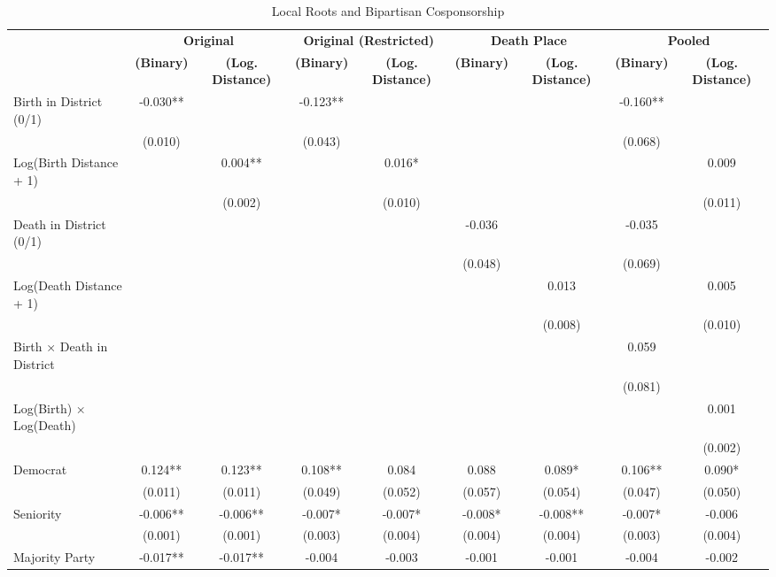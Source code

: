 \begin{table}[t]
\caption{Local Roots and Bipartisan Cosponsorship} 
\fontsize{9.0pt}{11.0pt}\selectfont
\begin{tabular*}{\linewidth}{@{\extracolsep{\fill}}lcccccccc}
\toprule
 & \multicolumn{2}{c}{{\bfseries \textbf{Original}}} & \multicolumn{2}{c}{{\bfseries \textbf{Original (Restricted)}}} & \multicolumn{2}{c}{{\bfseries \textbf{Death Place}}} & \multicolumn{2}{c}{{\bfseries \textbf{Pooled}}} \\ 
\cmidrule(lr){2-3} \cmidrule(lr){4-5} \cmidrule(lr){6-7} \cmidrule(lr){8-9}
{\bfseries  } & {\bfseries (Binary)} & {\bfseries (Log. Distance)} & {\bfseries (Binary)} & {\bfseries (Log. Distance)} & {\bfseries (Binary)} & {\bfseries (Log. Distance)} & {\bfseries (Binary)} & {\bfseries (Log. Distance)} \\ 
\midrule\addlinespace[2.5pt]
Birth in District (0/1) & -0.030** &  & -0.123** &  &  &  & -0.160** &  \\ 
 & (0.010) &  & (0.043) &  &  &  & (0.068) &  \\ 
Log(Birth Distance + 1) &  & 0.004** &  & 0.016* &  &  &  & 0.009 \\ 
 &  & (0.002) &  & (0.010) &  &  &  & (0.011) \\ 
Death in District (0/1) &  &  &  &  & -0.036 &  & -0.035 &  \\ 
 &  &  &  &  & (0.048) &  & (0.069) &  \\ 
Log(Death Distance + 1) &  &  &  &  &  & 0.013 &  & 0.005 \\ 
 &  &  &  &  &  & (0.008) &  & (0.010) \\ 
Birth × Death in District &  &  &  &  &  &  & 0.059 &  \\ 
 &  &  &  &  &  &  & (0.081) &  \\ 
Log(Birth) × Log(Death) &  &  &  &  &  &  &  & 0.001 \\ 
 &  &  &  &  &  &  &  & (0.002) \\ 
Democrat & 0.124** & 0.123** & 0.108** & 0.084 & 0.088 & 0.089* & 0.106** & 0.090* \\ 
 & (0.011) & (0.011) & (0.049) & (0.052) & (0.057) & (0.054) & (0.047) & (0.050) \\ 
Seniority & -0.006** & -0.006** & -0.007* & -0.007* & -0.008* & -0.008** & -0.007* & -0.006 \\ 
 & (0.001) & (0.001) & (0.003) & (0.004) & (0.004) & (0.004) & (0.003) & (0.004) \\ 
Majority Party & -0.017** & -0.017** & -0.004 & -0.003 & -0.001 & -0.001 & -0.004 & -0.002 \\ 

\end{tabular*}
\end{table}

